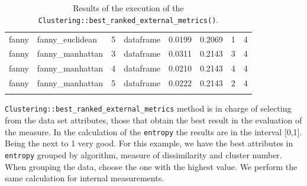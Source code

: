 {\begin{longtable}{| p{1cm} | p{1.8cm} | p{0.9cm} | p{1.1cm} | p{1.6cm} | p{0.8cm} | p{1.8cm} | p{1.5cm} |}
\scriptsize fanny      & \scriptsize fanny\_euclidean & \scriptsize     5     & \scriptsize dataframe  & \scriptsize     0.0199    & \scriptsize 0.2069 &  \scriptsize        1        & \scriptsize      4 \\
\cline{2-8}
\scriptsize fanny      & \scriptsize fanny\_manhattan & \scriptsize     3     & \scriptsize dataframe  & \scriptsize     0.0311    & \scriptsize 0.2143 &  \scriptsize        3        & \scriptsize      4 \\
\scriptsize fanny      & \scriptsize fanny\_manhattan & \scriptsize     4     & \scriptsize dataframe  & \scriptsize     0.0210    & \scriptsize 0.2143 &  \scriptsize        4        & \scriptsize      4 \\
\scriptsize fanny      & \scriptsize fanny\_manhattan & \scriptsize     5     & \scriptsize dataframe  & \scriptsize     0.0222    & \scriptsize 0.2143 &  \scriptsize        2        & \scriptsize      4 \\
\hline
\caption{Results of the execution of the \texttt{Clustering::best\_ranked\_external\_metrics()}.}
\label{tab:clusteringbestrankedexternalmetrics}
\end{longtable}}

\texttt{Clustering::best\_ranked\_external\_metrics} method is in charge of selecting from the data set attributes, those that obtain the best result in the evaluation of the measure. In the calculation of the \texttt{entropy} the results are in the interval [0,1]. Being the next to 1 very good. For this example, we have the best attributes in \texttt{entropy} grouped by algorithm, measure of dissimilarity and cluster number. When grouping the data, choose the one with the highest value. We perform the same calculation for internal measurements.

